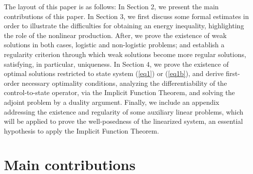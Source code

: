 \documentclass[11pt,reqno]{amsart}%
\numberwithin{equation}{section}
\begin{document}
The layout of this paper is as follows: In Section 2, we present the main contributions of this paper.
 In Section 3, we first  discuss some formal estimates in order to illustrate the difficulties for obtaining an energy inequality, highlighting the role of the nonlinear production. After, we prove 
 the existence of weak solutions  
in both cases, logistic and non-logistic problems; and establish
 a regularity criterion through which weak solutions become more regular solutions,
  satisfying, in particular, uniqueness. 
In Section 4, we prove the existence of optimal solutions restricted to state system (\ref{eq1}) or (\ref{eq1b}), 
and derive first-order necessary optimality conditions, analyzing the differentiability of the control-to-state operator, via the Implicit Function Theorem, and solving the adjoint problem by a duality argument. Finally, we include an appendix addressing the existence and regularity of some auxiliary linear problems, which will be applied to prove the well-posedness of the linearized system, an essential hypothesis to apply the Implicit Function Theorem.

\section{Main contributions}
\end{document}
